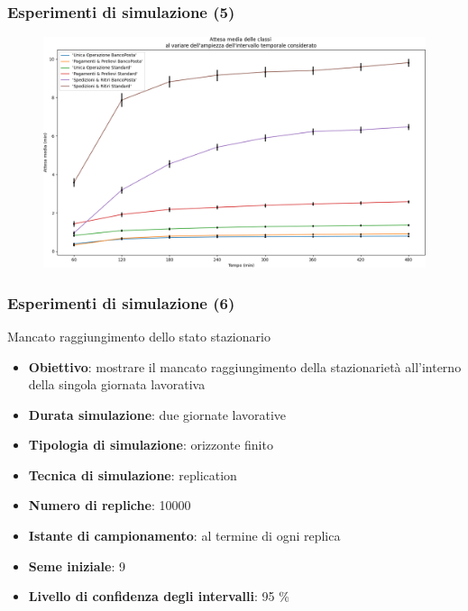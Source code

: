 \documentclass[
	usepdftitle=false,
	xcolor={table, dvipsnames},
	hyperref={
		pdftitle={Studio delle prestazioni di un Ufficio Postale ispirato a Poste Italiane},
    	pdfauthor={A. Chillotti, C. Cuffaro e S. Tiberi}
    }
]{beamer}
\begin{document}
\begin{frame}
\frametitle{Esperimenti di simulazione (5)}
\begin{figure}[ht]
\centering
\includegraphics[width=\textwidth]{plots/day-from-empty-all}
\end{figure}
\end{frame}

\begin{frame}
\frametitle{Esperimenti di simulazione (6)}
\begin{block}{Mancato raggiungimento dello stato stazionario}
\begin{itemize}
\item \textbf{Obiettivo}: mostrare il mancato raggiungimento della stazionarietà all'interno della singola giornata lavorativa
\item \textbf{Durata simulazione}: due giornate lavorative
\item \textbf{Tipologia di simulazione}: orizzonte finito
\item \textbf{Tecnica di simulazione}: replication
\item \textbf{Numero di repliche}: 10000
\item \textbf{Istante di campionamento}: al termine di ogni replica
\item \textbf{Seme iniziale}: 9
\item \textbf{Livello di confidenza degli intervalli}: 95 \%
\end{itemize}
\end{block}
\end{frame}
\end{document}

